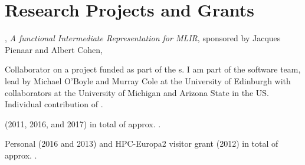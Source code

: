 \section{Research Projects and Grants}
\begin{cvitemize}
    \item {}, \textit{A functional Intermediate Representation for MLIR}, sponsored by Jacques Pienaar and Albert Cohen, 
    \item Collaborator on a project funded as part of the s. I am part of the software team, lead by Michael O'Boyle and Murray Cole at the University of Edinburgh with collaborators at the University of Michigan and Arizona State in the US.
      Individual contribution of .
    \item {} (2011, 2016, and 2017) in total of approx. .
    \item Personal  (2016 and 2013) and HPC-Europa2 visitor grant (2012) in total of approx. .
\end{cvitemize}